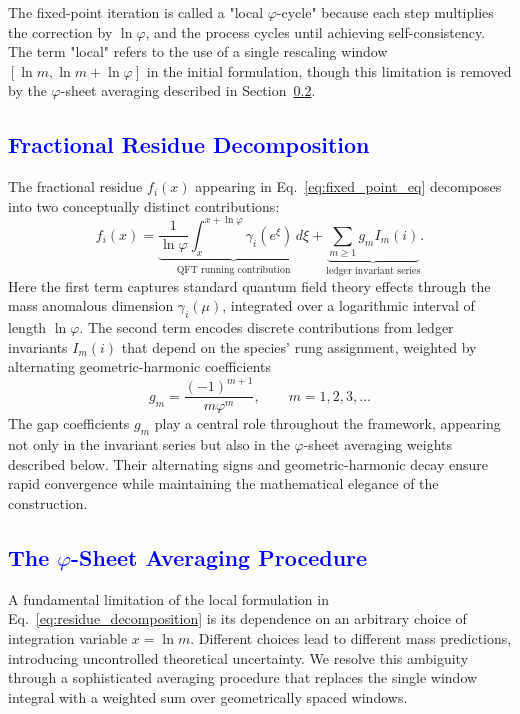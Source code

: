 \documentclass[%
amsmath,amssymb,
aps,
prb,
floatfix, showkeys, 10pt,
]{revtex4-2}
\newcommand{\modif}[1]{\textcolor{blue}{#1}}
\begin{document}
The fixed-point iteration is called a "local $\varphi$-cycle" because each step multiplies the correction by $\ln \varphi$, and the process cycles until achieving self-consistency. The term "local" refers to the use of a single rescaling window $[\ln m, \ln m + \ln \varphi]$ in the initial formulation, though this limitation is removed by the $\varphi$-sheet averaging described in Section~\ref{subsec:phi-sheet}.















{\modif{ \subsection{Fractional Residue Decomposition}
\label{fractional_res} }}
The fractional residue $f_i(x)$ appearing in Eq.~\eqref{eq:fixed_point_eq} decomposes into two conceptually distinct contributions:
\begin{equation}
f_i(x) = \underbrace{\frac{1}{\ln\varphi}\int_{x}^{x+\ln\varphi} \gamma_i(e^\xi) \, d\xi}_{\text{QFT running contribution}} + \underbrace{\sum_{m \geq 1} g_m I_m(i)}_{\text{ledger invariant series}}   .
\label{eq:residue_decomposition}
\end{equation}
Here the first term captures standard quantum field theory effects through the mass anomalous
dimension $\gamma_i(\mu)$, integrated over a logarithmic interval of length $\ln \varphi$. 
The second term encodes discrete contributions from ledger invariants $I_m(i)$ that depend
on the species' rung assignment, weighted by alternating geometric-harmonic coefficients
\begin{equation}
g_m = \frac{(-1)^{m+1}}{m \varphi^m}, \qquad m = 1, 2, 3, \ldots
\label{eq:gap_coefficients}
\end{equation}
The gap coefficients $g_m$ play a central role throughout the framework, appearing not only in the invariant series but also in the $\varphi$-sheet averaging weights described below. Their alternating signs and geometric-harmonic decay ensure rapid convergence while maintaining the mathematical elegance of the construction.










{\modif{ \subsection{The $\varphi$-Sheet Averaging Procedure}
\label{subsec:phi-sheet}  }}
A fundamental limitation of the local formulation in Eq.~\eqref{eq:residue_decomposition} is its dependence on an arbitrary choice of integration variable $x = \ln m$. Different choices lead to different mass predictions, introducing uncontrolled theoretical uncertainty. We resolve this ambiguity through a sophisticated averaging procedure that replaces the single window integral with a weighted sum over geometrically spaced windows.
\end{document}
